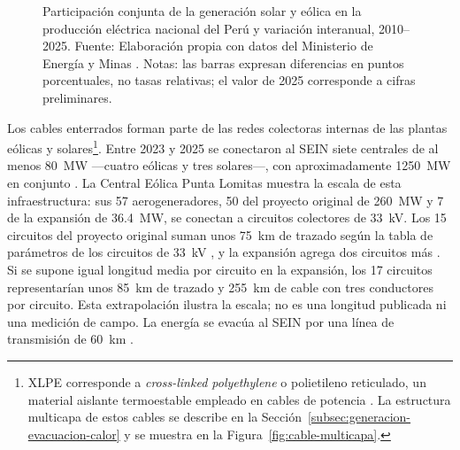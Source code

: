 \begin{figure}[htbp]
\caption[Participación de la generación solar y eólica en el Perú]{Participación conjunta de la generación solar y eólica en la producción eléctrica nacional del Perú y variación interanual, 2010--2025. Fuente: Elaboración propia con datos del Ministerio de Energía y Minas \parencites[sec.~10.4]{minem2025anuario2024}[cuadro~4]{minem2025indicadoresDiciembre}. Notas: las barras expresan diferencias en puntos porcentuales, no tasas relativas; el valor de 2025 corresponde a cifras preliminares.}
\label{fig:participacion-renovable-peru}
\end{figure}

Los cables enterrados forman parte de las redes colectoras internas de las plantas eólicas y solares\footnote{XLPE corresponde a \textit{cross-linked polyethylene} o polietileno reticulado, un material aislante termoestable empleado en cables de potencia \parencites[9--10]{thue1999electrical}{iec60502_2_2014}. La estructura multicapa de estos cables se describe en la Sección~\ref{subsec:generacion-evacuacion-calor} y se muestra en la Figura~\ref{fig:cable-multicapa}.}. Entre 2023 y 2025 se conectaron al SEIN siete centrales de al menos \SI{80}{\mega\watt} ---cuatro eólicas y tres solares---, con aproximadamente \SI{1250}{\mega\watt} en conjunto \parencites{osinergmin2024puntaLomitas}{minem2024nuevasRER}{minem2025nuevasCentrales}. La Central Eólica Punta Lomitas muestra la escala de esta infraestructura: sus 57 aerogeneradores, 50 del proyecto original de \SI{260}{\mega\watt} y 7 de la expansión de \SI{36.4}{\mega\watt}, se conectan a circuitos colectores de \SI{33}{\kilo\volt}. Los 15 circuitos del proyecto original suman unos \SI{75}{\kilo\metre} de trazado según la tabla de parámetros de los circuitos de \SI{33}{\kilo\volt} \parencite{coes2021puntaLomitasEO}, y la expansión agrega dos circuitos más \parencite{coes2022puntaLomitasExpansion}. Si se supone igual longitud media por circuito en la expansión, los 17 circuitos representarían unos \SI{85}{\kilo\metre} de trazado y \SI{255}{\kilo\metre} de cable con tres conductores por circuito. Esta extrapolación ilustra la escala; no es una longitud publicada ni una medición de campo. La energía se evacúa al SEIN por una línea de transmisión de \SI{60}{\kilo\metre} \parencite{engie2023puntaLomitas}.


